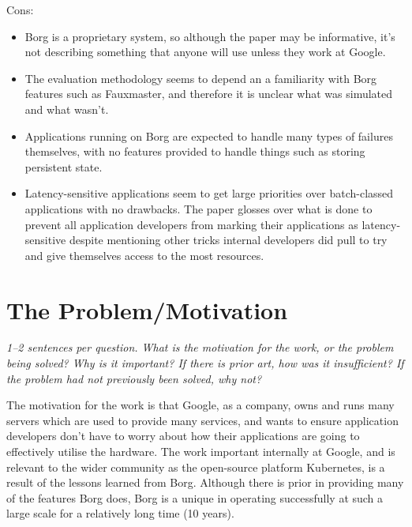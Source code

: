 \documentclass[11pt]{article}
\begin{document}
Cons:

\begin{itemize}

    \item Borg is a proprietary system, so although the paper may be
    informative, it's not describing something that anyone will use unless they
    work at Google.

    \item The evaluation methodology seems to depend an a familiarity with Borg
    features such as Fauxmaster, and therefore it is unclear what was simulated
    and what wasn't.

    \item Applications running on Borg are expected to handle many types of
    failures themselves, with no features provided to handle things such as
    storing persistent state.

    \item Latency-sensitive applications seem to get large priorities over
    batch-classed applications with no drawbacks. The paper glosses over what
    is done to prevent all application developers from marking their
    applications as latency-sensitive despite mentioning other tricks internal
    developers did pull to try and give themselves access to the most
    resources.

\end{itemize}

\section*{The Problem/Motivation}

\textsl{1--2 sentences per question. What is the motivation for the work, or
the problem being solved? Why is it important? If there is prior art, how was
it insufficient? If the problem had not previously been solved, why not?}

The motivation for the work is that Google, as a company, owns and runs many
servers which are used to provide many services, and wants to ensure
application developers don't have to worry about how their applications are
going to effectively utilise the hardware. The work important internally at
Google, and is relevant to the wider community as the open-source platform
Kubernetes, is a result of the lessons learned from Borg. Although there is
prior in providing many of the features Borg does, Borg is a unique in
operating successfully at such a large scale for a relatively long time (10
years).
\end{document}
